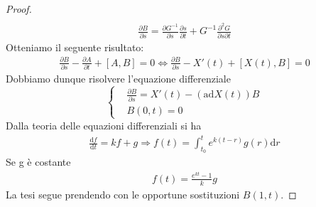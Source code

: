 \begin{proof}
\begin{equation*}
\begin{split}
\end{split}\end{equation*}
\begin{equation*}\begin{split}
\frac{\partial B}{\partial s}=\frac{\partial G^{-1}}{\partial s}\frac{\partial s}{\partial t}+G^{-1}\frac{\partial ^2G}{\partial s\partial t}
\end{split}\end{equation*}
Otteniamo il seguente risultato:
\begin{equation*}\begin{split}
\frac{\partial B}{\partial s}-\frac{\partial A}{\partial t}+\left[A,B\right]=0 \Longleftrightarrow \frac{\partial B}{\partial s}-X'\left(t\right)+\left[X\left(t\right),B\right]=0
\end{split}\end{equation*}
Dobbiamo dunque risolvere l'equazione differenziale
\begin{equation*}
\left\{
\begin{aligned}
&\frac{\partial B}{\partial s}=X'\left(t\right)-\left(\textrm{ad}X\left(t\right)\right)B \\
& B\left(0,t\right)=0
\end{aligned}
\right.
\end{equation*}
Dalla teoria delle equazioni differenziali si ha
\begin{equation*}\begin{split}
\frac{\textrm{d}f}{\textrm{d}t}=kf+g \Longrightarrow f\left(t\right)=\int_{t_0}^{t}{e^{k\left(t-r\right)}g\left(r\right)\textrm{d}r}
\end{split}\end{equation*}
Se g è costante
\begin{equation*}\begin{split}
f\left(t\right)=\frac{e^{kt}-1}{k}g
\end{split}\end{equation*}
La tesi segue prendendo con le opportune sostituzioni $B\left(1,t\right)$.
\end{proof}

